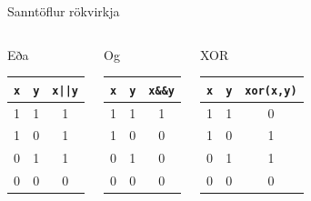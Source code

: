 \documentclass[handout]{beamer}
\begin{document}
\begin{frame}{Sanntöflur rökvirkja}
\begin{columns}
\begin{center}
Eða\\
\begin{tabular}{ccc}
\toprule
\texttt{x}&\texttt{y}&\texttt{x||y}\\
\midrule
1&1&1\\
1&0&1\\
0&1&1\\
0&0&0\\
\bottomrule
\end{tabular}
\end{center}
\begin{center}
Og\\
\begin{tabular}{ccc}
\toprule
\texttt{x}&\texttt{y}&\texttt{x\&\&y}\\
\midrule
1&1&1\\
1&0&0\\
0&1&0\\
0&0&0\\
\bottomrule
\end{tabular}
\end{center}
\begin{center}
XOR\\
\begin{tabular}{ccc}
\toprule
\texttt{x}&\texttt{y}&\texttt{xor(x,y)}\\
\midrule
1&1&0\\
1&0&1\\
0&1&1\\
0&0&0\\
\bottomrule
\end{tabular}
\end{center}
\end{columns}
\end{frame}
\end{document}

